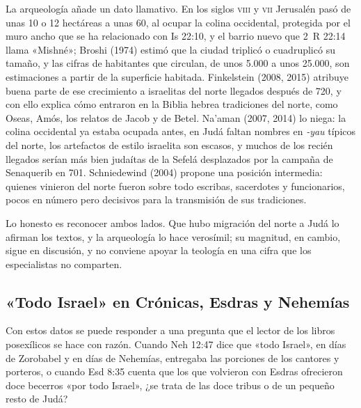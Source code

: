 La arqueología añade un dato llamativo. En los siglos \textsc{viii} y \textsc{vii} Jerusalén pasó de unas 10 o 12 hectáreas a unas 60, al ocupar la colina occidental, protegida por el muro ancho que se ha relacionado con Is 22:10, y el barrio nuevo que 2~R 22:14 llama «Mishné»; Broshi (1974) estimó que la ciudad triplicó o cuadruplicó su tamaño, y las cifras de habitantes que circulan, de unos 5.000 a unos 25.000, son estimaciones a partir de la superficie habitada. Finkelstein (2008, 2015) atribuye buena parte de ese crecimiento a israelitas del norte llegados después de 720, y con ello explica cómo entraron en la Biblia hebrea tradiciones del norte, como Oseas, Amós, los relatos de Jacob y de Betel. Na'aman (2007, 2014) lo niega: la colina occidental ya estaba ocupada antes, en Judá faltan nombres en \emph{-yau} típicos del norte, los artefactos de estilo israelita son escasos, y muchos de los recién llegados serían más bien judaítas de la Sefelá desplazados por la campaña de Senaquerib en 701. Schniedewind (2004) propone una posición intermedia: quienes vinieron del norte fueron sobre todo escribas, sacerdotes y funcionarios, pocos en número pero decisivos para la transmisión de sus tradiciones.

Lo honesto es reconocer ambos lados. Que hubo migración del norte a Judá lo afirman los textos, y la arqueología lo hace verosímil; su magnitud, en cambio, sigue en discusión, y no conviene apoyar la teología en una cifra que los especialistas no comparten.

\subsection{«Todo Israel» en Crónicas, Esdras y Nehemías}
Con estos datos se puede responder a una pregunta que el lector de los libros posexílicos se hace con razón. Cuando Neh 12:47 dice que «todo Israel», en días de Zorobabel y en días de Nehemías, entregaba las porciones de los cantores y porteros, o cuando Esd 8:35 cuenta que los que volvieron con Esdras ofrecieron doce becerros «por todo Israel», ¿se trata de las doce tribus o de un pequeño resto de Judá?

